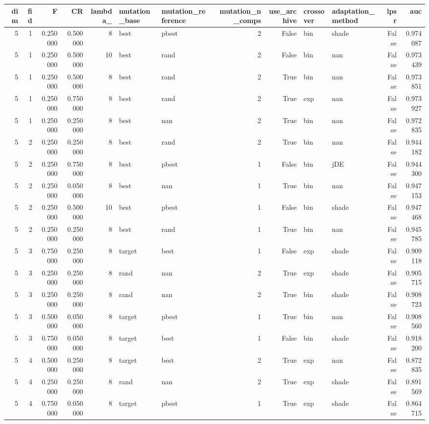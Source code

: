 \begin{tabular}{rrrrrllrrllrr}
\toprule
dim & fid & F & CR & lambda_ & mutation_base & mutation_reference & mutation_n_comps & use_archive & crossover & adaptation_method & lpsr & auc \\
\midrule
5 & 1 & 0.250000 & 0.500000 & 8 & best & pbest & 2 & False & bin & shade & False & 0.974087 \\
5 & 1 & 0.250000 & 0.500000 & 10 & best & rand & 2 & False & bin & nan & False & 0.973439 \\
5 & 1 & 0.250000 & 0.500000 & 8 & best & rand & 2 & True & bin & nan & False & 0.973851 \\
5 & 1 & 0.250000 & 0.750000 & 8 & best & rand & 2 & True & exp & nan & False & 0.973927 \\
5 & 1 & 0.250000 & 0.250000 & 8 & best & nan & 2 & True & bin & nan & False & 0.972835 \\
5 & 2 & 0.250000 & 0.250000 & 8 & best & rand & 2 & True & bin & nan & False & 0.944182 \\
5 & 2 & 0.250000 & 0.750000 & 8 & best & pbest & 1 & False & bin & jDE & False & 0.944300 \\
5 & 2 & 0.250000 & 0.050000 & 8 & best & nan & 1 & True & bin & nan & False & 0.947153 \\
5 & 2 & 0.250000 & 0.500000 & 10 & best & pbest & 1 & False & bin & shade & False & 0.947468 \\
5 & 2 & 0.250000 & 0.250000 & 8 & best & rand & 1 & True & bin & nan & False & 0.945785 \\
5 & 3 & 0.750000 & 0.250000 & 8 & target & best & 1 & False & exp & shade & False & 0.909118 \\
5 & 3 & 0.250000 & 0.250000 & 8 & rand & nan & 2 & True & exp & shade & False & 0.905715 \\
5 & 3 & 0.250000 & 0.250000 & 8 & rand & nan & 2 & True & bin & shade & False & 0.908723 \\
5 & 3 & 0.500000 & 0.050000 & 8 & target & pbest & 1 & True & bin & nan & False & 0.908560 \\
5 & 3 & 0.750000 & 0.050000 & 8 & target & best & 1 & False & bin & shade & False & 0.918200 \\
5 & 4 & 0.500000 & 0.250000 & 8 & target & best & 2 & True & exp & nan & False & 0.872835 \\
5 & 4 & 0.250000 & 0.250000 & 8 & rand & nan & 2 & True & exp & shade & False & 0.891569 \\
5 & 4 & 0.750000 & 0.050000 & 8 & target & pbest & 1 & True & exp & shade & False & 0.864715 \\

\end{tabular}
